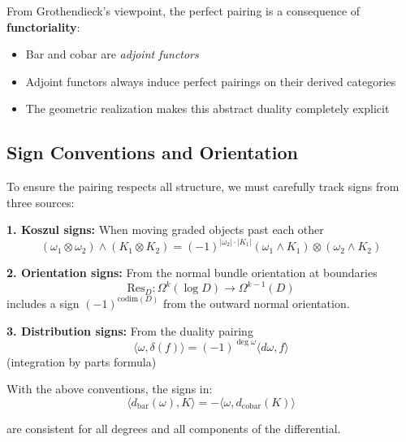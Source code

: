 \begin{remark}
From Grothendieck's viewpoint, the perfect pairing is a consequence of \textbf{functoriality}:
\begin{itemize}
\item Bar and cobar are \emph{adjoint functors}
\item Adjoint functors always induce perfect pairings on their derived categories
\item The geometric realization makes this abstract duality completely explicit
\end{itemize}
\end{remark}

\subsection{Sign Conventions and Orientation}

\begin{convention}\label{conv:pairing-signs}
To ensure the pairing respects all structure, we must carefully track signs from three sources:

\textbf{1. Koszul signs:} When moving graded objects past each other
$$(\omega_1 \otimes \omega_2) \wedge (K_1 \otimes K_2) = (-1)^{|\omega_2| \cdot |K_1|} 
(\omega_1 \wedge K_1) \otimes (\omega_2 \wedge K_2)$$

\textbf{2. Orientation signs:} From the normal bundle orientation at boundaries
$$\text{Res}_{D}: \Omega^k(\log D) \to \Omega^{k-1}(D)$$
includes a sign $(-1)^{\text{codim}(D)}$ from the outward normal orientation.

\textbf{3. Distribution signs:} From the duality pairing
$$\langle \omega, \delta(f) \rangle = (-1)^{\deg \omega} \langle d\omega, f \rangle$$
(integration by parts formula)
\end{convention}

\begin{lemma}\label{lem:sign-consistency}
With the above conventions, the signs in:
$$\langle d_{\text{bar}}(\omega), K \rangle = -\langle \omega, d_{\text{cobar}}(K) \rangle$$

are consistent for all degrees and all components of the differential.
\end{lemma}


